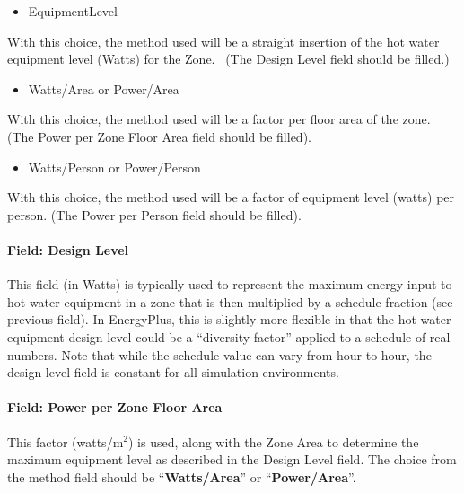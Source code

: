 \begin{itemize}
\tightlist
\item
  EquipmentLevel
\end{itemize}

With this choice, the method used will be a straight insertion of the hot water equipment level (Watts) for the Zone.~ (The Design Level field should be filled.)

\begin{itemize}
\tightlist
\item
  Watts/Area or Power/Area
\end{itemize}

With this choice, the method used will be a factor per floor area of the zone. (The Power per Zone Floor Area field should be filled).

\begin{itemize}
\tightlist
\item
  Watts/Person or Power/Person
\end{itemize}

With this choice, the method used will be a factor of equipment level (watts) per person. (The Power per Person field should be filled).

\paragraph{Field: Design Level}\label{field-design-level-2-000}

This field (in Watts) is typically used to represent the maximum energy input to hot water equipment in a zone that is then multiplied by a schedule fraction (see previous field). In EnergyPlus, this is slightly more flexible in that the hot water equipment design level could be a ``diversity factor'' applied to a schedule of real numbers. Note that while the schedule value can vary from hour to hour, the design level field is constant for all simulation environments.

\paragraph{Field: Power per Zone Floor Area}\label{field-power-per-zone-floor-area-1}

This factor (watts/m\(^{2}\)) is used, along with the Zone Area to determine the maximum equipment level as described in the Design Level field. The choice from the method field should be ``\textbf{Watts/Area}'' or ``\textbf{Power/Area}''.

